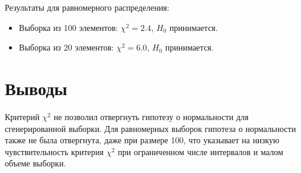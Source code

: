 \documentclass[a4paper]{article}
\begin{document}
    Результаты для равномерного распределения:
    \begin{itemize}
        \item Выборка из 100 элементов: $\chi^2 = 2.4$, $H_0$ принимается.
        \item Выборка из 20 элементов: $\chi^2 = 6.0$, $H_0$ принимается.
    \end{itemize}


    \section{Выводы}
    Критерий $\chi^2$ не позволил отвергнуть гипотезу о нормальности для сгенерированной выборки.
    Для равномерных выборок гипотеза о нормальности также не была отвергнута, даже при размере 100,
    что указывает на низкую чувствительность критерия $\chi^2$ при ограниченном числе интервалов и малом объеме выборки.
\end{document}
